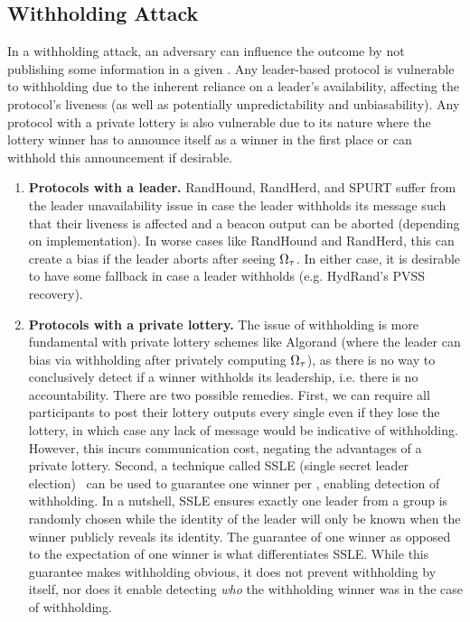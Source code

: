 \subsection{Withholding Attack}
\label{subsection:withholding}
In a withholding attack, an adversary can influence the outcome by not publishing some information in a given \epoch. Any leader-based protocol is vulnerable to withholding due to the inherent reliance on a leader's availability, affecting the protocol's liveness (as well as potentially unpredictability and unbiasability). Any protocol with a private lottery is also vulnerable due to its nature where the lottery winner has to announce itself as a winner in the first place or can withhold this announcement if desirable.
\begin{enumerate}
\item \textbf{Protocols with a leader.} RandHound, RandHerd, and SPURT suffer from the leader unavailability issue in case the leader withholds its message such that their liveness is affected and a beacon output can be aborted (depending on implementation). In worse cases like RandHound and RandHerd, this can create a bias if the leader aborts after seeing $\Omega_\tau$. In either case, it is desirable to have some fallback in case a leader withholds (e.g. HydRand's PVSS recovery).
\item \textbf{Protocols with a private lottery.} The issue of withholding is more fundamental with private lottery schemes like Algorand (where the leader can bias via withholding after privately computing $\Omega_\tau$), as there is no way to conclusively detect if a winner withholds its leadership, i.e. there is no accountability. There are two possible remedies. First, we can require all participants to post their lottery outputs every single \epoch even if they lose the lottery, in which case any lack of message would be indicative of withholding. However, this incurs communication cost, negating the advantages of a private lottery. Second, a technique called SSLE (single secret leader election)~\cite{boneh2020single} can be used to guarantee one winner per \epoch, enabling detection of withholding. In a nutshell, SSLE ensures exactly one leader from a group is randomly chosen while the identity of the leader will only be known when the winner publicly reveals its identity. The guarantee of one winner as opposed to the expectation of one winner is what differentiates SSLE. While this guarantee makes withholding obvious, it does not prevent withholding by itself, nor does it enable detecting \emph{who} the withholding winner was in the case of withholding.
\end{enumerate}

